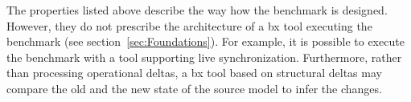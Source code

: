 %
%
%	
%	
%		
%	
%	

The properties listed above describe the way how the benchmark is designed. However, they do not prescribe the architecture of a bx tool executing the benchmark (see section~\ref{sec:Foundations}). For example, it is possible to execute the benchmark with a tool supporting live synchronization. Furthermore, rather than processing operational deltas, a bx tool based on structural deltas may compare the old and the new state of the source model to infer the changes.

